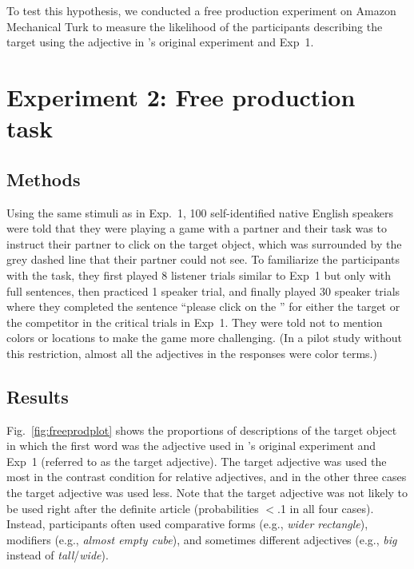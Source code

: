 \documentclass[10pt,letterpaper]{article}
\begin{document}
To test this hypothesis, we conducted a free production experiment on Amazon Mechanical Turk to measure the 
 likelihood of the participants describing the target using the adjective in \citeauthor{LeffelXiangKennedy2016:Imprecision-is-Pragmatic-}'s original experiment and Exp~1.





\section{Experiment 2: Free production task}



\subsection{Methods}

Using the same stimuli as in Exp.~1, 100 self-identified native English speakers were told that they were playing a game with a partner
 and 
 their task was to instruct their partner to click on the target object, which was surrounded by the 
 grey dashed line that their partner could not see. 
To familiarize the participants with the task, they first played 8 listener trials similar to Exp~1 
 but only with full sentences,
 then practiced 1 speaker trial, and finally played 30 speaker trials where they completed the sentence 
 ``please click on the \underline{\quad}'' for either the target or the competitor in the critical trials in
 Exp~1. 
They were told not to mention colors or locations to make the game more challenging. (In a pilot study without this restriction, almost all the adjectives in the responses were color terms.) 


\subsection{Results} 

Fig.~\ref{fig:freeprodplot} shows the proportions of descriptions of the target object 
 in which the first word was the adjective used 
 in \citeauthor{LeffelXiangKennedy2016:Imprecision-is-Pragmatic-}'s original experiment and Exp~1 
 (referred to as the target adjective).
The target adjective was used the most in the contrast condition for relative adjectives, and in the 
other three cases the target adjective was used less.
Note that the target adjective was not likely to be used right after the definite article
 (probabilities $<$.1 in all four cases). 
Instead, participants often used comparative forms (e.g., \emph{wider rectangle}), 
 modifiers (e.g., \emph{almost empty cube}), and sometimes different adjectives (e.g., \emph{big} instead of \emph{tall}/\emph{wide}). 
\end{document}

